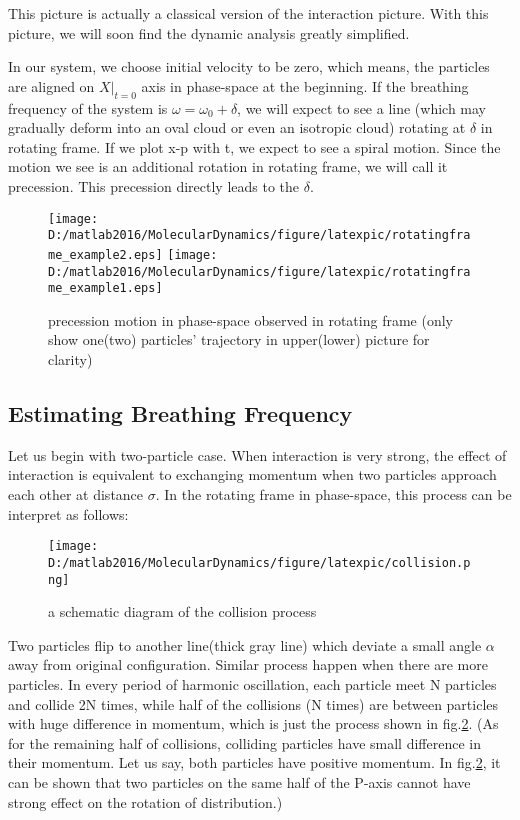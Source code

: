 \documentclass[aps,pre,twocolumn
,groupedaddress]{revtex4-1}
\begin{document}
This picture is actually a classical version of the interaction picture. With this picture, we will soon find the dynamic analysis greatly simplified.

In our system, we choose initial velocity to be zero, which means, the particles are aligned on $X|_{t=0}$ axis in phase-space at the beginning. If the breathing frequency of the system is $\omega=\omega_0+\delta$, we will expect to see a line (which may gradually deform into an oval cloud or even an isotropic cloud) rotating at $\delta$ in rotating frame. If we plot x-p with t, we expect to see a spiral motion. Since the motion we see is an additional rotation in rotating frame, we will call it precession. This precession directly leads to the $\delta$.


\begin{figure}[hbtp]
\centering
\texttt{[image: D:/matlab2016/MolecularDynamics/figure/latexpic/rotatingframe\_example2.eps]} 
\texttt{[image: D:/matlab2016/MolecularDynamics/figure/latexpic/rotatingframe\_example1.eps]} 
\caption{precession motion in phase-space observed in rotating frame (only show one(two) particles' trajectory in upper(lower) picture for clarity)}
\label{fig:Breathingfrequency2}
\end{figure}


{\color{red}{ONE SET OF PICTURES HERE TO SHOW THE TIME EVOLUTION OF THE CLOUD IN PHASE-SPACE:
N=20, same E and $F_0$, several initial states:
Stationary frame: T/4 T/2 3T/4 T
rotating frame: T/4 T/2 3T/4 T}}



\subsection{Estimating Breathing Frequency}
Let us begin with two-particle case. When interaction is very strong, the effect of interaction is equivalent to exchanging momentum when two particles approach each other at distance $\sigma$. In the rotating frame in phase-space, this process can be interpret as follows:

\begin{figure}
\centering
\texttt{[image: D:/matlab2016/MolecularDynamics/figure/latexpic/collision.png]}
\caption{a schematic diagram of the collision process}
\label{fig:Breathingfrequency3}
\end{figure}


Two particles flip to another line(thick gray line) which deviate a small angle $\alpha$ away from original configuration. Similar process happen when there are more particles. In every period of harmonic oscillation, each particle meet N particles and collide 2N times, while half of the collisions (N times) are between particles with huge difference in momentum, which is just the process shown in fig.\ref{fig:Breathingfrequency3}. (As for the remaining half of collisions, colliding particles have small difference in their momentum. Let us say, both particles have positive momentum. In fig.\ref{fig:Breathingfrequency3}, it can be shown that two particles on the same half of the P-axis cannot have strong effect on the rotation of distribution.)
\end{document}
